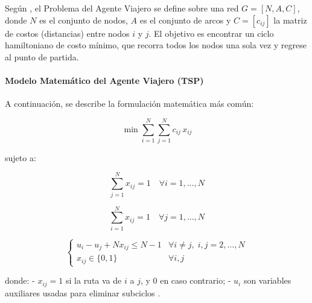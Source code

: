\documentclass[12pt,titlepage,twoside,openright]{book}
\begin{document}
Según \citep{torres2018}, el Problema del Agente Viajero se define sobre una red \(G = [N,A,C]\), donde \(N\) es el conjunto de nodos, \(A\) es el conjunto de arcos y \(C = [c_{ij}]\) la matriz de costos (distancias) entre nodos \(i\) y \(j\). El objetivo es encontrar un ciclo hamiltoniano de costo mínimo, que recorra todos los nodos una sola vez y regrese al punto de partida.

\paragraph{Modelo Matemático del Agente Viajero (TSP)}

A continuación, se describe la formulación matemática más común:

\begin{equation}
\min \sum_{i=1}^N \sum_{j=1}^N c_{ij}\,x_{ij}
\label{eq:TSP_obj}
\end{equation}

sujeto a:

\begin{equation}
\sum_{j=1}^N x_{ij} = 1 \quad \forall i = 1,\dots,N
\label{eq:TSP_out}
\end{equation}

\begin{equation}
\sum_{i=1}^N x_{ij} = 1 \quad \forall j = 1,\dots,N
\label{eq:TSP_in}
\end{equation}

\begin{equation}
\begin{cases}
u_i - u_j + N x_{ij} \le N-1 & \forall i \neq j,\; i,j=2,\dots,N \\
x_{ij} \in \{0,1\} & \forall i,j
\end{cases}
\label{eq:TSP_subtour_bin}
\end{equation}

donde:
- \(x_{ij} = 1\) si la ruta va de \(i\) a \(j\), y 0 en caso contrario;
- \(u_i\) son variables auxiliares usadas para eliminar subciclos \citep{torres2018}.
\end{document}
